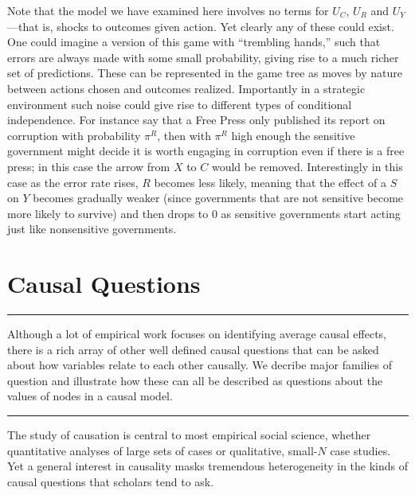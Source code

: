 \documentclass[12pt,]{book}
\begin{document}
Note that the model we have examined here involves no terms for \(U_C\), \(U_R\) and \(U_Y\)---that is, shocks to outcomes given action. Yet clearly any of these could exist. One could imagine a version of this game with ``trembling hands,'' such that errors are always made with some small probability, giving rise to a much richer set of predictions. These can be represented in the game tree as moves by nature between actions chosen and outcomes realized. Importantly in a strategic environment such noise could give rise to different types of conditional independence. For instance say that a Free Press only published its report on corruption with probability \(\pi^R\), then with \(\pi^R\) high enough the sensitive government might decide it is worth engaging in corruption even if there is a free press; in this case the arrow from \(X\) to \(C\) would be removed. Interestingly in this case as the error rate rises, \(R\) becomes less likely, meaning that the effect of a \(S\) on \(Y\) becomes gradually weaker (since governments that are not sensitive become more likely to survive) and then drops to 0 as sensitive governments start acting just like nonsensitive governments.

\hypertarget{questions}{%
\chapter{Causal Questions}\label{questions}}

\begin{center}\rule{0.5\linewidth}{\linethickness}\end{center}

Although a lot of empirical work focuses on identifying average causal effects, there is a rich array of other well defined causal questions that can be asked about how variables relate to each other causally. We decribe major families of question and illustrate how these can all be described as questions about the values of nodes in a causal model.

\begin{center}\rule{0.5\linewidth}{\linethickness}\end{center}

The study of causation is central to most empirical social science, whether quantitative analyses of large sets of cases or qualitative, small-\(N\) case studies. Yet a general interest in causality masks tremendous heterogeneity in the kinds of causal questions that scholars tend to ask.
\end{document}

